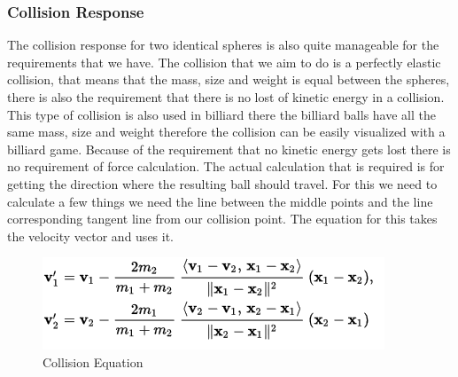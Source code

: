\documentclass{sig-alternate-05-2015}
\begin{document}
\subsubsection{Collision Response}
The collision response for two identical spheres is also quite manageable for the requirements that we have. The collision that we aim to do is a perfectly elastic collision, that means that the mass, size and weight is equal between the spheres, there is also the requirement that there is no lost of kinetic energy in a collision. This type of collision is also used in billiard there the billiard balls have all the same mass, size and weight therefore the collision can be easily visualized with a billiard game. Because of the requirement that no kinetic energy gets lost there is no requirement of force calculation. The actual calculation that is required is for getting the direction where the resulting ball should travel. For this we need to calculate a few things we need the line between the middle points and the line corresponding tangent line from our collision point. The equation for this takes the velocity vector and uses it. 

\begin{figure}[!htbp]
  \begin{center}
\includegraphics[scale=0.85]{CollisionSphereEquation.png}
  \end{center}
  \caption{Collision Equation}
\end{figure}
\end{document}
